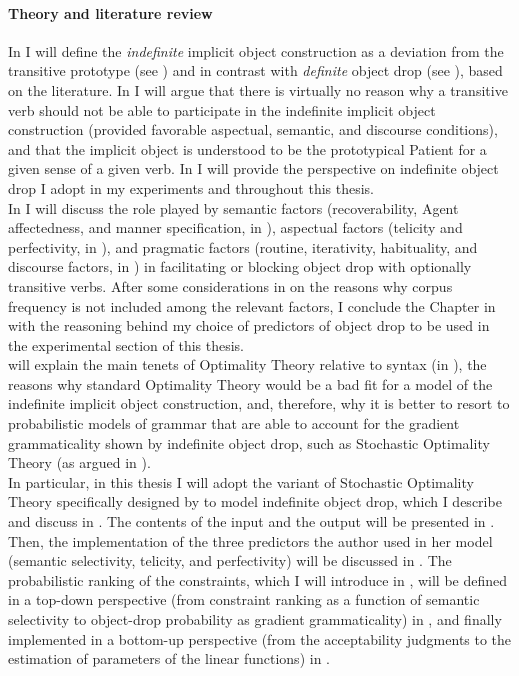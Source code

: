 \paragraph{Theory and literature review}
In  I will define the \textit{indefinite} implicit object construction as a deviation from the transitive prototype (see ) and in contrast with \textit{definite} object drop (see ), based on the literature. In  I will argue that there is virtually no reason why a transitive verb should not be able to participate in the indefinite implicit object construction (provided favorable aspectual, semantic, and discourse conditions), and that the implicit object is understood to be the prototypical Patient for a given sense of a given verb. In  I will provide the perspective on indefinite object drop I adopt in my experiments and throughout this thesis.\\
In  I will discuss the role played by semantic factors (recoverability, Agent affectedness, and manner specification, in ), aspectual factors (telicity and perfectivity, in ), and pragmatic factors (routine, iterativity, habituality, and discourse factors, in ) in facilitating or blocking object drop with optionally transitive verbs. After some considerations in  on the reasons why corpus frequency is not included among the relevant factors, I conclude the Chapter in  with the reasoning behind my choice of predictors of object drop to be used in the experimental section of this thesis.\\
 will explain the main tenets of Optimality Theory relative to syntax (in ), the reasons why standard Optimality Theory would be a bad fit for a model of the indefinite implicit object construction, and, therefore, why it is better to resort to probabilistic models of grammar that are able to account for the gradient grammaticality shown by indefinite object drop, such as Stochastic Optimality Theory (as argued in ).\\
In particular, in this thesis I will adopt the variant of Stochastic Optimality Theory specifically designed by \textcite{Medina2007} to model indefinite object drop, which I describe and discuss in . The contents of the input and the output will be presented in . Then, the implementation of the three predictors the author used in her model (semantic selectivity, telicity, and perfectivity) will be discussed in . The probabilistic ranking of the constraints, which I will introduce in , will be defined in a top-down perspective (from constraint ranking as a function of semantic selectivity to object-drop probability as gradient grammaticality) in , and finally implemented in a bottom-up perspective (from the acceptability judgments to the estimation of parameters of the linear functions) in .

